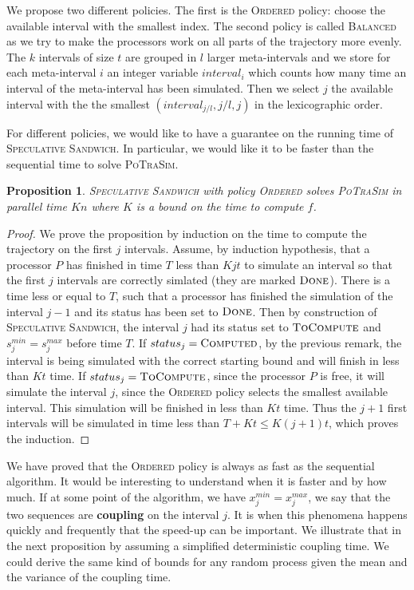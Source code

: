 \documentclass[a4paper,10pt]{article}
\newtheorem{proposition}{Proposition}
\begin{document}
We propose two different policies. 
The first is the \textsc{Ordered} policy: choose the available interval with the smallest index. 
The second policy is called \textsc{Balanced} as we try to make the processors work on all parts of the trajectory more evenly. The $k$ intervals of size $t$ are grouped in $l$ larger meta-intervals and we store for each meta-interval $i$ an integer variable $interval_i$ which counts how many time an interval of the meta-interval has been simulated.
 Then we select $j$ the available interval with the the smallest $(interval_{j/l},j/l,j)$ in the lexicographic order. 

For different policies, we would like to have a guarantee on the running time of  \textsc{Speculative Sandwich}. In particular, we would like it to be faster than the sequential time to solve \textsc{PoTraSim}.

\begin{proposition}
 \textsc{Speculative Sandwich} with policy \textsc{Ordered} solves \textsc{PoTraSim} in parallel time $Kn$ where $K$ is a bound on the time to compute $f$.
\end{proposition}
\begin{proof}
We prove the proposition by induction on the time to compute the trajectory on the first $j$ intervals. 
Assume, by induction hypothesis, that a processor $P$ has finished in time $T$ less than $Kjt$ to simulate an interval so that the first $j$ intervals are correctly simlated (they are marked $\textsc{Done}$). There is a time less or equal to $T$, such that a processor has finished the simulation of the interval $j-1$ and its status has been set to $\textsc{Done}$. Then by construction of \textsc{Speculative Sandwich}, the interval $j$ had its status set to $\textsc{ToCompute}$ and $s_j^{min} = s_j^{max}$ before time $T$.
If $status_j =  \textsc{Computed}$, by the previous remark, the interval is being 
simulated with the correct starting bound and will finish in less than $Kt$ time.
If $status_j =  \textsc{ToCompute}$, since the processor $P$ is free, it will simulate the interval $j$, since the \textsc{Ordered} policy selects the smallest available interval. This simulation will be finished in less than $Kt$ time. Thus the $j+1$ first intervals will be simulated in time less than $T + Kt \leq K(j+1)t$, which proves the induction.
\end{proof}

We have proved that the \textsc{Ordered} policy is always as fast as the sequential algorithm.
It would be interesting to understand when it is faster and by how much. 
If at some point of the algorithm, we have  $x_j^{min} = x_j^{max}$, we say that the 
two sequences are \textbf{coupling} on the interval $j$. It is when this phenomena happens quickly and frequently that the speed-up can be important. We illustrate that in the next proposition by assuming a simplified deterministic coupling time.
We could derive the same kind of bounds for any random process given the mean and the variance of the coupling time.
\end{document}
